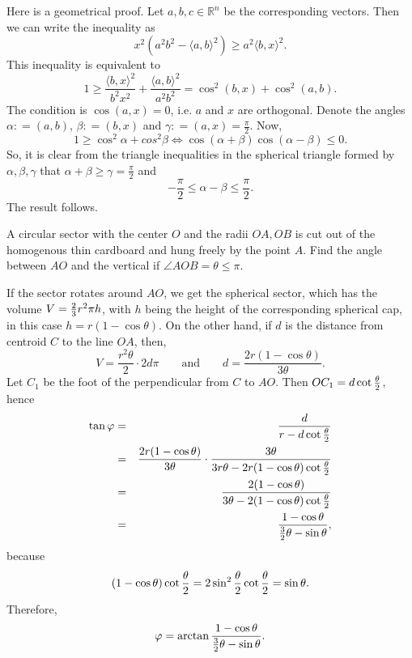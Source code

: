 \begin{solution}[name={Solution by Spanferkel}] 
	Here is a geometrical proof. Let $a,b,c\in\mathbb{R}^n$ be the corresponding vectors. Then we can write the inequality as
	\[x^2(a^2b^2- \langle a,b \rangle ^2)\ge a^2 \langle b,x \rangle ^2.\]
	This inequality is equivalent to
	\[ 1\ge\frac{ \langle b,x \rangle ^2}{b^2x^2}+\frac{ \langle a,b \rangle ^2}{a^2b^2}=\cos^2(b,x)+\cos^2(a,b).\]
	The condition is $\cos(a,x)=0$, i.e. $a$ and $x$ are orthogonal. Denote the angles $\alpha: =(a,b)$, $\beta: =(b,x)$ and $\gamma: =(a,x)=\frac\pi2$. Now,
	\[1\ge\cos^2\alpha+cos^2\beta \Leftrightarrow\cos(\alpha+\beta)\cos(\alpha-\beta)\leq 0.\] 
	So, it is clear from the triangle inequalities in the spherical triangle formed by $\alpha,\beta, \gamma$ that $\alpha+\beta\ge\gamma=\frac\pi2$ and \[-\frac\pi2\le\alpha-\beta\le\frac{\pi}2.\] The result follows.
\end{solution}






\begin{question}[name={Hanging Sector by Farenhajt}]
	A circular sector with the center $O$ and the radii $OA, OB$ is cut out of the homogenous thin cardboard and hung freely by the point $A$. Find the angle between $AO$ and the vertical if $\angle AOB=\theta\leq\pi$.
\end{question}





\begin{solution}[name={Solution by Farenhajt}] 
	If the sector rotates around $AO$, we get the spherical sector, which has the volume $V={2\over 3}r^{2}\pi h$, with $h$ being the height of the corresponding spherical cap, in this case $h=r(1-\cos\theta)$. On the other hand, if $d$ is the distance from centroid $C$ to the line $OA$, then, \[V=\frac{r^{2}\theta}{2}\cdot 2d\pi \qquad \text{and} \qquad d=\frac{2r(1-\cos\theta)}{3\theta}.\]
	Let $C_{1}$ be the foot of the perpendicular from $C$ to $AO$. Then $OC_{1}=d\cot{\theta\over 2}$, hence
	\begin{eqnarray*}\tan\varphi &=& \frac{d}{r-d\cot{\theta\over 2}}\\ &=& \frac{2r(1-\cos\theta)}{3\theta}\cdot\frac{3\theta}{3r\theta-2r(1-\cos\theta)\cot{\theta\over 2}}\\ &=& \frac{2(1-\cos\theta)}{3\theta-2(1-\cos\theta)\cot{\theta\over 2}}\\ &=& \frac{1-\cos\theta}{{3\over 2}\theta-\sin\theta},\end{eqnarray*}
	because \[(1-\cos\theta)\cot{\theta\over 2}=2\sin^{2}{\theta\over 2}\cot{\theta\over 2}=\sin\theta.\]
	Therefore, \[\varphi=\arctan\frac{1-\cos\theta}{{3\over 2}\theta-\sin\theta}.\]
\end{solution}





